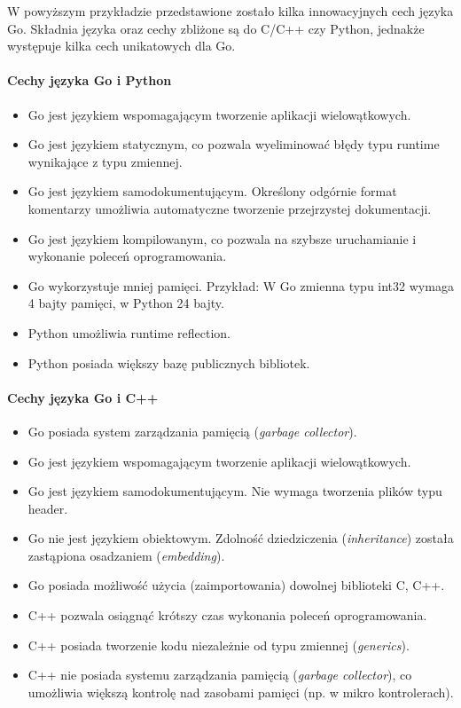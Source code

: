 \documentclass[a4paper,12pt,twoside,openany]{report}
\begin{document}
W powyższym przykładzie przedstawione zostało kilka innowacyjnych cech języka Go.
Składnia języka oraz cechy zbliżone są do C/C++ czy Python, jednakże występuje kilka cech unikatowych dla Go.

\paragraph{Cechy języka Go i Python}
\begin{itemize}
 \item Go jest językiem wspomagającym tworzenie aplikacji wielowątkowych.
 \item Go jest językiem statycznym, co pozwala wyeliminować błędy typu runtime wynikające z typu zmiennej.
 \item Go jest językiem samodokumentującym. Określony odgórnie format komentarzy umożliwia automatyczne tworzenie przejrzystej dokumentacji.
 \item Go jest językiem kompilowanym, co pozwala na szybsze uruchamianie i wykonanie poleceń oprogramowania.
 \item Go wykorzystuje mniej pamięci. Przykład: W Go zmienna typu int32 wymaga 4 bajty pamięci, w Python 24 bajty.
 \item Python umożliwia runtime reflection.
 \item Python posiada większy bazę publicznych bibliotek.
\end{itemize}

\paragraph{Cechy języka Go i C++}
\begin{itemize}
 \item Go posiada system zarządzania pamięcią (\textit{garbage collector}).
 \item Go jest językiem wspomagającym tworzenie aplikacji wielowątkowych.
 \item Go jest językiem samodokumentującym. Nie wymaga tworzenia plików typu header.
 \item Go nie jest językiem obiektowym. Zdolność dziedziczenia (\textit{inheritance}) została zastąpiona osadzaniem (\textit{embedding}).
 \item Go posiada możliwość użycia (zaimportowania) dowolnej biblioteki C, C++.
 \item C++ pozwala osiągnąć krótszy czas wykonania poleceń oprogramowania.
 \item C++ posiada tworzenie kodu niezależnie od typu zmiennej (\textit{generics}).
 \item C++ nie posiada systemu zarządzania pamięcią (\textit{garbage collector}), co umożliwia większą kontrolę nad zasobami pamięci (np. w mikro kontrolerach).
\end{itemize}
\end{document}
